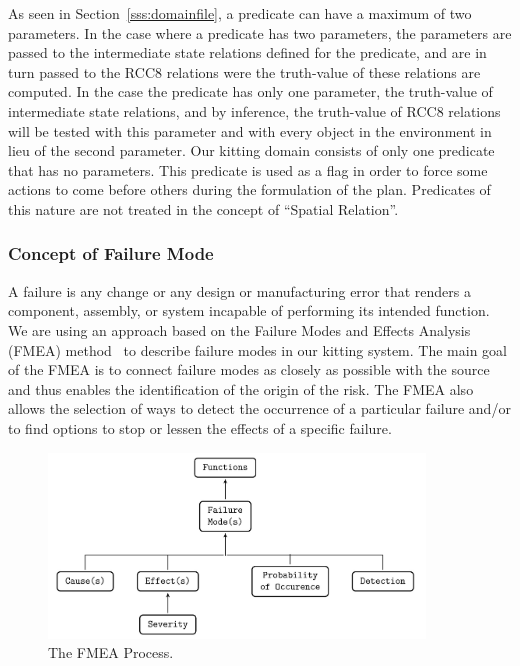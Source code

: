 \begin{itemize}
As seen in Section~\ref{sss:domainfile}, a predicate can have a maximum of two parameters. In the case where a predicate has two parameters, the parameters are passed to the intermediate state relations defined for the predicate, and are in turn passed to the RCC8 relations were the truth-value of these relations are computed. In the case the predicate has only one parameter, the truth-value of intermediate state relations, and by inference, the truth-value of RCC8 relations will be tested with this parameter and with every object in the environment in lieu of the second parameter. Our kitting domain consists of only one predicate that has no parameters. This predicate is used as a flag in order to force some actions to come before others during the formulation of the plan. Predicates of this nature are not treated in the concept of ``Spatial Relation''.
\end{itemize}

\subsubsection{Concept of Failure Mode}\label{sss:failure}
A failure is any change or any design or manufacturing error that renders a component, assembly, or system incapable of performing its intended function. We are using an approach based on the Failure Modes and Effects Analysis (FMEA) method~\cite{NANNIKAR.ICTBM.2012} to describe failure modes in our kitting system. The main goal of the FMEA is to connect failure modes as closely as possible with the source and thus enables the identification of the origin of the risk. The FMEA also allows the selection of ways to detect the occurrence of a particular failure and/or to find options to stop or lessen the effects of a specific failure.




\begin{figure}[ht!]
\centering
\includegraphics[width=10cm]{images/ActionFailures.pdf}
\caption{The FMEA Process.}
\label{fig:ActionFailures}
\end{figure}


